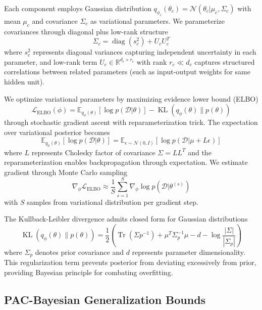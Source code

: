 \documentclass[10pt,journal,compsoc]{IEEEtran}
\newcommand{\R}{\mathbb{R}}
\DeclareMathOperator{\Tr}{Tr}
\DeclareMathOperator{\diag}{diag}
\DeclareMathOperator{\KL}{KL}
\begin{document}
Each component employs Gaussian distribution $q_{\phi_c}(\theta_c) = \mathcal{N}(\theta_c | \mu_c, \Sigma_c)$ with mean $\mu_c$ and covariance $\Sigma_c$ as variational parameters. We parameterize covariances through diagonal plus low-rank structure
\begin{equation}
\Sigma_c = \diag(s_c^2) + U_c U_c^T
\end{equation}
where $s_c^2$ represents diagonal variances capturing independent uncertainty in each parameter, and low-rank term $U_c \in \R^{d_c \times r_c}$ with rank $r_c \ll d_c$ captures structured correlations between related parameters (such as input-output weights for same hidden unit).

We optimize variational parameters by maximizing evidence lower bound (ELBO)
\begin{equation}
\mathcal{L}_{\text{ELBO}}(\phi) = \mathbb{E}_{q_\phi(\theta)}[\log p(\mathcal{D} | \theta)] - \KL(q_\phi(\theta) \| p(\theta))
\end{equation}
through stochastic gradient ascent with reparameterization trick. The expectation over variational posterior becomes
\begin{equation}
\mathbb{E}_{q_\phi(\theta)}[\log p(\mathcal{D} | \theta)] = \mathbb{E}_{\epsilon \sim \mathcal{N}(0,I)}[\log p(\mathcal{D} | \mu + L\epsilon)]
\end{equation}
where $L$ represents Cholesky factor of covariance $\Sigma = LL^T$ and the reparameterization enables backpropagation through expectation. We estimate gradient through Monte Carlo sampling
\begin{equation}
\nabla_\phi \mathcal{L}_{\text{ELBO}} \approx \frac{1}{S}\sum_{s=1}^S \nabla_\phi \log p(\mathcal{D} | \theta^{(s)})
\end{equation}
with $S$ samples from variational distribution per gradient step.

The Kullback-Leibler divergence admits closed form for Gaussian distributions
\begin{equation}
\KL(q_\phi(\theta) \| p(\theta)) = \frac{1}{2}\left(\Tr(\Sigma p^{-1}) + \mu^T \Sigma_p^{-1} \mu - d - \log\frac{|\Sigma|}{|\Sigma_p|}\right)
\end{equation}
where $\Sigma_p$ denotes prior covariance and $d$ represents parameter dimensionality. This regularization term prevents posterior from deviating excessively from prior, providing Bayesian principle for combating overfitting.

\subsection{PAC-Bayesian Generalization Bounds}
\end{document}
